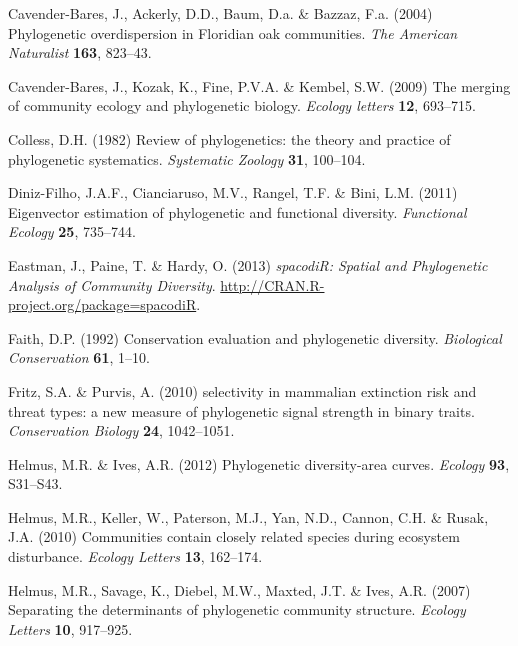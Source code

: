 \documentclass{bioinfo}
\begin{document}
\begin{thebibliography}{30}
Cavender-Bares, J., Ackerly, D.D., Baum, D.a. \& Bazzaz, F.a. (2004)
  {Phylogenetic overdispersion in Floridian oak communities}. \emph{The
  American Naturalist} \textbf{163}, 823--43.

Cavender-Bares, J., Kozak, K., Fine, P.V.A. \& Kembel, S.W. (2009) {The merging
  of community ecology and phylogenetic biology}. \emph{Ecology letters}
  \textbf{12}, 693--715.

Colless, D.H. (1982) Review of phylogenetics: the theory and practice of
  phylogenetic systematics. \emph{Systematic Zoology} \textbf{31}, 100--104.

Diniz-Filho, J.A.F., Cianciaruso, M.V., Rangel, T.F. \& Bini, L.M. (2011)
  Eigenvector estimation of phylogenetic and functional diversity.
  \emph{Functional Ecology} \textbf{25}, 735--744.

Eastman, J., Paine, T. \& Hardy, O. (2013) \emph{spacodiR: Spatial and
  Phylogenetic Analysis of Community Diversity}.
  \urlprefix\url{http://CRAN.R-project.org/package=spacodiR}.

Faith, D.P. (1992) Conservation evaluation and phylogenetic diversity.
  \emph{Biological Conservation} \textbf{61}, 1--10.

Fritz, S.A. \& Purvis, A. (2010) selectivity in mammalian extinction risk and
  threat types: a new measure of phylogenetic signal strength in binary traits.
  \emph{Conservation Biology} \textbf{24}, 1042--1051.

Helmus, M.R. \& Ives, A.R. (2012) Phylogenetic diversity-area curves.
  \emph{Ecology} \textbf{93}, S31--S43.

Helmus, M.R., Keller, W., Paterson, M.J., Yan, N.D., Cannon, C.H. \& Rusak,
  J.A. (2010) Communities contain closely related species during ecosystem
  disturbance. \emph{Ecology Letters} \textbf{13}, 162--174.

Helmus, M.R., Savage, K., Diebel, M.W., Maxted, J.T. \& Ives, A.R. (2007)
  Separating the determinants of phylogenetic community structure.
  \emph{Ecology Letters} \textbf{10}, 917--925.


\end{thebibliography}
\end{document}
